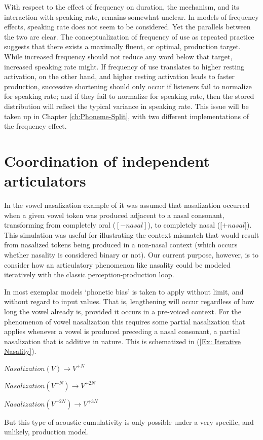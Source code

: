 With respect to the effect of frequency on duration, the mechanism,
and its interaction with speaking rate, remains somewhat unclear.
In models of frequency effects, speaking rate does not seem to be
considered. Yet the parallels between the two are clear. The conceptualization
of frequency of use as repeated practice suggests that there exists
a maximally fluent, or optimal, production target. While increased
frequency should not reduce any word below that target, increased
speaking rate might. If frequency of use translates to higher resting
activation, on the other hand, and higher resting activation leads
to faster production, successive shortening should only occur if listeners
fail to normalize for speaking rate; and if they fail to normalize
for speaking rate, then the stored distribution will reflect the typical
variance in speaking rate. This issue will be taken up in Chapter
\ref{ch:Phoneme-Split}, with two different implementations of the
frequency effect.

\section{Coordination of independent articulators}

In the vowel nasalization example of 
it was assumed that nasalization occurred when a given vowel token
was produced adjacent to a nasal consonant, transforming from completely
oral ($[-nasal]$), to completely nasal ($[+nasal${]}). This simulation
was useful for illustrating the context mismatch that would result
from nasalized tokens being produced in a non-nasal context (which
occurs whether nasality is considered binary or not). Our current
purpose, however, is to consider how an articulatory phenomenon like
nasality could be modeled iteratively with the classic perception-production
loop. 

In most exemplar models `phonetic bias' is taken to apply without
limit, and without regard to input values. That is, lengthening will
occur regardless of how long the vowel already is, provided it occurs
in a pre-voiced context. For the phenomenon of vowel nasalization
this requires some partial nasalization that applies whenever a vowel
is produced preceding a nasal consonant, a partial nasalization that
is additive in nature. This is schematized in (\ref{Ex: Iterative Nasality}). 
\begin{covexample}
\label{Ex: Iterative Nasality}$\textit{Nasalization}(V)\rightarrow V^{+N}$

$\textit{Nasalization}(V^{+N})\rightarrow V^{+2N}$

$\textit{Nasalization}(V^{+2N})\rightarrow V^{+3N}$
\end{covexample}
But this type of acoustic cumulativity is only possible under a very
specific, and unlikely, production model. 

